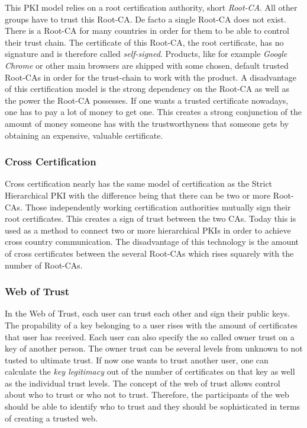 This PKI model relies on a root certification authority, short \textit{Root-CA}.
All other groups have to trust this Root-CA.
De facto a single Root-CA does not exist. There is a Root-CA for many countries
in order for them to be able to control their trust chain.
The certificate of this Root-CA, the
root certificate, has no signature and is therefore called \textit{self-signed}.
Products, like for example \textit{Google Chrome} or other main browsers are
shipped with some chosen, default trusted Root-CAs in order for the trust-chain
to work with the product. A disadvantage of this certification model is the
strong dependency on the Root-CA as well as the power the Root-CA possesses.
If one wants a trusted certificate nowadays, one has to pay a lot of money to
get one. This creates a strong conjunction of the amount of money someone has with
the trustworthyness that someone gets by obtaining an expensive, valuable certificate.

\subsubsection{Cross Certification}

Cross certification nearly has the same model of certification as the Strict
Hierarchical PKI with the difference being that there can be two or more
Root-CAs. Those independently working certification authorities mutually
sign their root certificates. This creates a sign of trust between the two
CAs. Today this is used as a method to connect two or more hierarchical PKIs
in order to achieve cross country communication. The disadvantage of this
technology is the amount of cross certificates between the several Root-CAs
which rises squarely with the number of Root-CAs.

\subsubsection{Web of Trust}

In the Web of Trust, each user can trust each other and sign their public keys.
The propability of a key belonging to a user rises with the amount of certificates
that user has received. Each user can also specify the so called owner trust on
a key of another person. The owner trust can be several levels from unknown to
not tusted to ultimate trust. If now one wants to trust another user, one can
calculate the \textit{key legitimacy} out of the number of certificates on that
key as well as the individual trust levels. The concept of the web of trust allows
control about who to trust or who not to trust. Therefore, the participants of
the web should be able to identify who to trust and they should be sophisticated
in terms of creating a trusted web.

